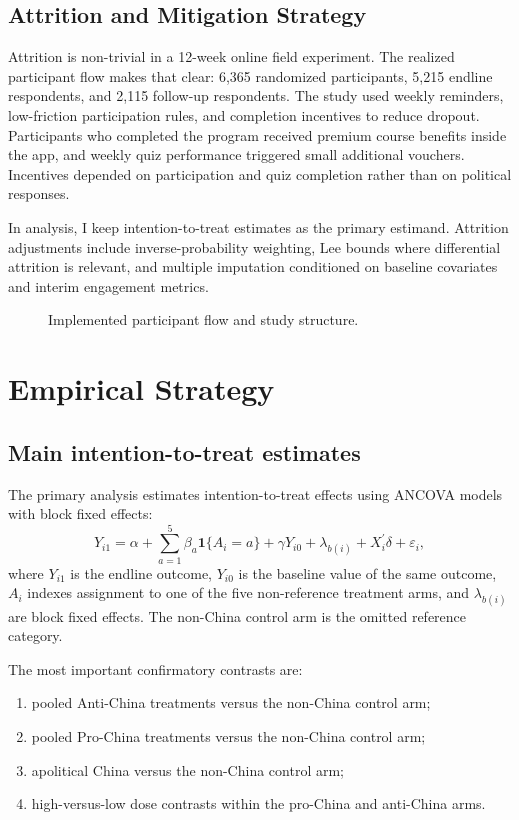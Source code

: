 \documentclass[12pt,american]{article}
\begin{document}
\subsection{Attrition and Mitigation Strategy}

Attrition is non-trivial in a 12-week online field experiment. The realized participant flow makes that clear: 6,365 randomized participants, 5,215 endline respondents, and 2,115 follow-up respondents. The study used weekly reminders, low-friction participation rules, and completion incentives to reduce dropout. Participants who completed the program received premium course benefits inside the app, and weekly quiz performance triggered small additional vouchers. Incentives depended on participation and quiz completion rather than on political responses.

In analysis, I keep intention-to-treat estimates as the primary estimand. Attrition adjustments include inverse-probability weighting, Lee bounds where differential attrition is relevant, and multiple imputation conditioned on baseline covariates and interim engagement metrics.

\begin{figure}[H]
\centering
\scalebox{0.7}{}
\caption{Implemented participant flow and study structure.}
\label{fig:flow}
\end{figure}

\section{Empirical Strategy}

\subsection{Main intention-to-treat estimates}

The primary analysis estimates intention-to-treat effects using ANCOVA models with block fixed effects:
\[
Y_{i1}
=
\alpha
+
\sum_{a=1}^{5}\beta_a\mathbf{1}\{A_i=a\}
+
\gamma Y_{i0}
+
\lambda_{b(i)}
+
X_i^\prime\delta
+
\varepsilon_i,
\]
where \(Y_{i1}\) is the endline outcome, \(Y_{i0}\) is the baseline value of the same outcome, \(A_i\) indexes assignment to one of the five non-reference treatment arms, and \(\lambda_{b(i)}\) are block fixed effects. The non-China control arm is the omitted reference category.

The most important confirmatory contrasts are:
\begin{enumerate}[label=\arabic*., leftmargin=1.5em]
\item pooled Anti-China treatments versus the non-China control arm;
\item pooled Pro-China treatments versus the non-China control arm;
\item apolitical China versus the non-China control arm;
\item high-versus-low dose contrasts within the pro-China and anti-China arms.
\end{enumerate}
\end{document}

